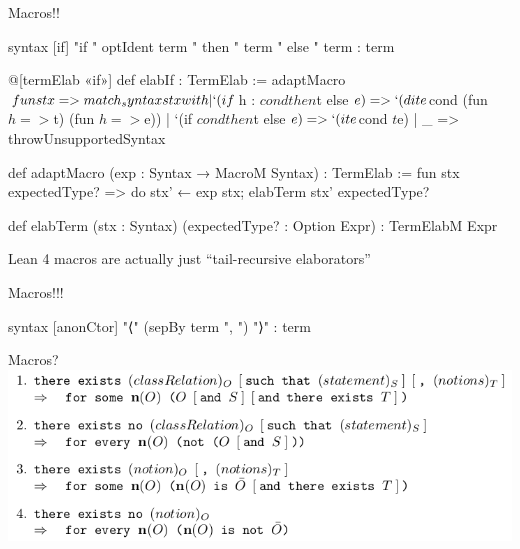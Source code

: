 \documentclass[t]{beamer}
\begin{document}
\begin{frame}[fragile]{Macros!!}
\begin{leancode}
syntax [if] "if " optIdent term " then " term " else " term : term
\end{leancode}

\begin{leancode}
@[termElab «if»] def elabIf : TermElab :=
adaptMacro $ fun stx => match_syntax stx with
| `(if $h : $cond then $t else $e) => `(dite $cond (fun $h => $t) (fun $h => $e))
| `(if $cond then $t else $e)      => `(ite $cond $t $e)
| _                                => throwUnsupportedSyntax

def adaptMacro (exp : Syntax → MacroM Syntax) : TermElab :=
fun stx expectedType? => do
  stx' ← exp stx;
  elabTerm stx' expectedType?

def elabTerm (stx : Syntax) (expectedType? : Option Expr) : TermElabM Expr
\end{leancode}
  Lean 4 macros are actually just ``tail-recursive elaborators''
\end{frame}

\begin{frame}[fragile]{Macros!!!}
\begin{leancode}
syntax [anonCtor] "⟨" (sepBy term ", ") "⟩" : term
\end{leancode}

\end{frame}

\begin{frame}{Macros?}
  \vfill
  \includegraphics[width=\textwidth]{macro}
  \vfill
\end{frame}
\end{document}
